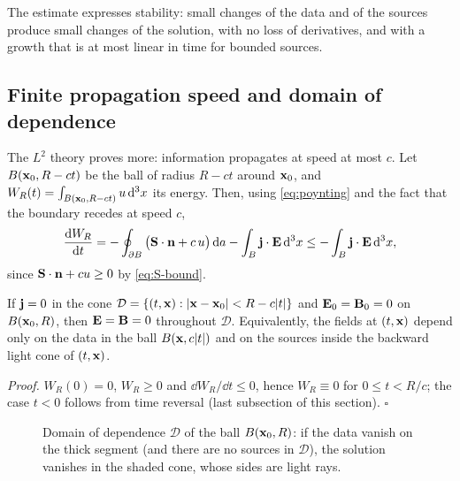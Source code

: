The estimate expresses stability: small changes of the data and of
the sources produce small changes of the solution, with no loss of
derivatives, and with a growth that is at most linear in time for
bounded sources.

\subsection{Finite propagation speed and domain of dependence}

The $L^2$ theory proves more: information propagates at speed at most $c$.
Let $B(\mathbf{x}_0,R-ct)$ be the ball of radius $R-ct$ around $\mathbf{x}_0$, and
$W_R(t)=\int_{B(\mathbf{x}_0,R-ct)}u\,\mathrm{d}^3x$ its energy.  Then, using
\eqref{eq:poynting} and the fact that the boundary recedes at speed $c$,
\begin{equation}
\frac{\mathrm{d} W_R}{\mathrm{d} t}
=-\oint_{\partial B}\big(\mathbf{S}\cdot\mathbf{n}+c\,u\big)\,\mathrm{d} a-\int_{B}\mathbf{j}\cdot\mathbf{E}\,\mathrm{d}^3x
\le-\int_B\mathbf{j}\cdot\mathbf{E}\,\mathrm{d}^3x ,
\end{equation}
since $\mathbf{S}\cdot\mathbf{n}+cu\ge0$ by \eqref{eq:S-bound}.

\begin{proposition}\label{prop:local-energy}
If $\mathbf{j}=0$ in the cone $\mathcal D=\{(t,\mathbf{x}):|\mathbf{x}-\mathbf{x}_0|<R-c|t|\}$ and
$\mathbf{E}_0=\mathbf{B}_0=0$ on $B(\mathbf{x}_0,R)$, then $\mathbf{E}=\mathbf{B}=0$ throughout $\mathcal D$.
Equivalently, the fields at $(t,\mathbf{x})$ depend only on the data in the
ball $B(\mathbf{x},c|t|)$ and on the sources inside the backward light cone of
$(t,\mathbf{x})$.
\end{proposition}
\noindent\emph{Proof.}  $W_R(0)=0$, $W_R\ge0$ and $\dd W_R/\dd t\le0$, hence
$W_R\equiv0$ for $0\le t<R/c$; the case $t<0$ follows from time
reversal (last subsection of this section).  $\square$

\begin{figure}[t]
\centering
{}
\caption{Domain of dependence $\mathcal D$ of the ball $B(\mathbf{x}_0,R)$: if the data vanish on the
thick segment (and there are no sources in $\mathcal D$), the solution vanishes in the shaded
cone, whose sides are light rays.}\label{fig:domain}
\end{figure}

